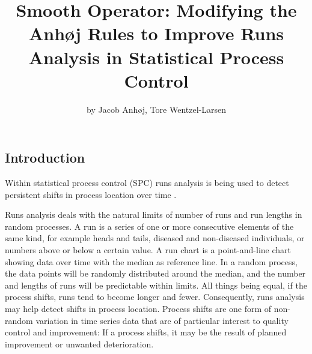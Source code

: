 \title{Smooth Operator: Modifying the Anhøj Rules to Improve Runs Analysis in
Statistical Process Control}
\author{by Jacob Anhøj, Tore Wentzel-Larsen}

\maketitle



\hypertarget{introduction}{%
\subsection{Introduction}\label{introduction}}

Within statistical process control (SPC) runs analysis is being used to
detect persistent shifts in process location over time
\citep{anhoej2018}.

Runs analysis deals with the natural limits of number of runs and run
lengths in random processes. A run is a series of one or more
consecutive elements of the same kind, for example heads and tails,
diseased and non-diseased individuals, or numbers above or below a
certain value. A run chart is a point-and-line chart showing data over
time with the median as reference line. In a random process, the data
points will be randomly distributed around the median, and the number
and lengths of runs will be predictable within limits. All things being
equal, if the process shifts, runs tend to become longer and fewer.
Consequently, runs analysis may help detect shifts in process location.
Process shifts are one form of non-random variation in time series data
that are of particular interest to quality control and improvement: If a
process shifts, it may be the result of planned improvement or unwanted
deterioration.

